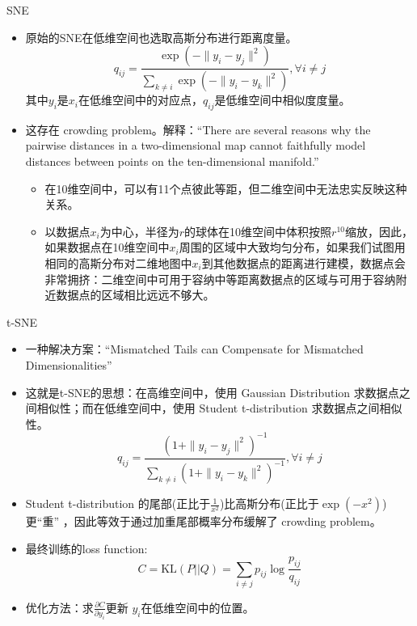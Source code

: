 \begin{frame}{SNE}
    \begin{itemize}
        \item 原始的SNE在低维空间也选取高斯分布进行距离度量。
        \[
            q_{ij} = \frac{\exp(-\|y_i - y_j\|^2)}{\sum_{k \neq i} \exp(-\|y_i - y_k\|^2)}, \forall i \neq  j
        \]
        其中$y_i$是$x_i$在低维空间中的对应点，$q_{ij}$是低维空间中相似度度量。
        \item 这存在 crowding problem。解释：``There are several reasons why the pairwise distances in a two-dimensional map cannot faithfully
        model distances between points on the ten-dimensional manifold.''
        \begin{itemize}
            \item 在10维空间中，可以有11个点彼此等距，但二维空间中无法忠实反映这种关系。
            \item 以数据点$x_i$为中心，半径为$r$的球体在10维空间中体积按照$r^{10}$缩放，因此，如果数据点在10维空间中$x_i$周围的区域中大致均匀分布，如果我们试图用相同的高斯分布对二维地图中$x_i$到其他数据点的距离进行建模，数据点会非常拥挤：二维空间中可用于容纳中等距离数据点的区域与可用于容纳附近数据点的区域相比远远不够大。
        \end{itemize}
    \end{itemize}
\end{frame}

\begin{frame}{t-SNE}
    \begin{itemize}
        \item 一种解决方案：``Mismatched Tails can Compensate for Mismatched Dimensionalities''
        \item 这就是t-SNE的思想：在高维空间中，使用 Gaussian Distribution 求数据点之间相似性；而在低维空间中，使用 Student t-distribution 求数据点之间相似性。
        \[
            q_{ij} = \frac{(1 + \|y_i - y_j\|^2)^{-1}}{\sum_{k \neq i} (1 + \|y_i - y_k\|^2)^{-1}}, \forall i \neq  j
        \]
        \item Student t-distribution 的尾部(正比于$\frac{1}{x^{2}}$)比高斯分布(正比于$\exp(-x^{2})$)更“重” ，因此等效于通过加重尾部概率分布缓解了 crowding problem。
        \item 最终训练的loss function:
        \[
            C = \text{KL}(P||Q) = \sum_{i\neq j} p_{ij} \log \frac{p_{ij}}{q_{ij}}
        \]
        \item 优化方法：求$\frac{\partial C}{\partial y_i}$更新 $y_i$在低维空间中的位置。
    \end{itemize}
\end{frame}


